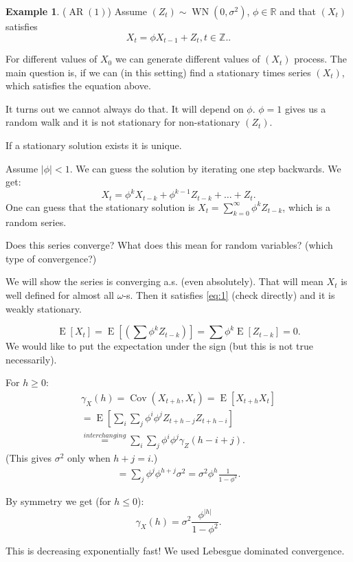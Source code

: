 \documentclass[12pt,a4paper, notitlepage]{book}
\theoremstyle{definition} %
\newtheorem{example}{Example}[chapter]
\theoremstyle{plain} %
\newcommand{\R}{\mathbb R}
\newcommand{\Z}{\mathbb Z}
\DeclareMathOperator{\Cov}{Cov}
\DeclareMathOperator{\E}{E}
\DeclareMathOperator{\Wn}{WN}
\DeclareMathOperator{\Ar}{AR}
\begin{document}
\begin{example} ($\Ar(1)$)
Assume $(Z_t) \sim \Wn(0, \sigma^2)$, $\phi \in \R$ and that $(X_t)$ satisfies 
\[  X_t = \phi X_{t-1} +Z_t, t \in \Z .  \label{eq:1} .\] 


For different values of $X_0$ we can generate different values of $(X_t)$ process. The main question is, if we can (in this setting) find a stationary times series $(X_t)$, which satisfies
the equation above.

It turns out we cannot always do that. It will depend on $\phi$. $\phi = 1$ gives us a random walk and it is not stationary for non-stationary $(Z_t)$.

If a stationary solution exists it is unique.

Assume $|\phi| < 1$. We can guess the solution by iterating one step backwards. We get:
\[ X_t = \phi^k X_{t-k} + \phi^{k-1}Z_{t-k} + \dots + Z_t  . \] 
One can guess that the stationary solution   is $X_t = \sum_{k = 0}^\infty \phi^k Z_{t-k}$, which is a random series. 

Does this series converge? What does this mean for random variables? (which type of convergence?) 

We will show the series is converging a.s. (even absolutely). That will mean $X_t$ is well defined for almost all $\omega$-s. Then it satisfies  
\ref{eq:1} (check directly) and it is weakly stationary. 

\[ \E[X_t] = \E\left[\left(\sum \phi^k Z_{t-k} \right) \right] = \sum \phi^k \E[Z_{t-k}] = 0 . \] 
We would like to put the expectation under the sign (but this is not true necessarily). 

For $h \geq 0$: 
\begin{align*} \gamma_X(h) = \Cov(X_{t +h }, X_t) = \E \left[X_{t+h}X_t \right] \\ 
= \E \left[ \sum_i \sum_j \phi^i \phi^j Z_{t + h - j} Z_{t + h - i} \right] \\ 
\overset{interchanging}{=}   \sum_i \sum _j \phi^i \phi^j \gamma_Z(h-i+j). \end{align*}
(This gives $\sigma^2$ only when $h+j = i$.)
\begin{align*} = \sum_j \phi^j \phi^{h + j}\sigma^2 = \sigma^2 \phi^h \frac{1}{1 - \phi^2}. \end{align*}

By symmetry we get (for $h \leq 0$):
\[ \gamma_X(h) = \sigma^2 \frac{\phi^{|h|}}{1 - \phi^2} . \]

This is decreasing exponentially fast! We used Lebesgue dominated convergence.



\end{example}
\end{document}
